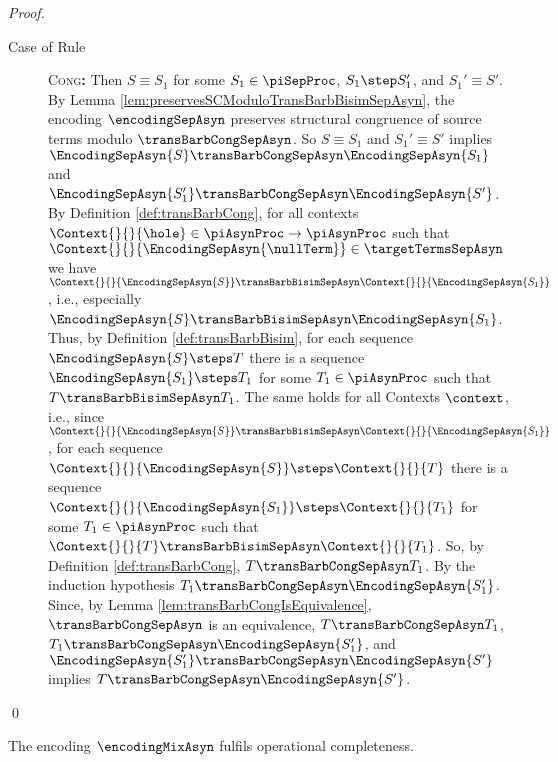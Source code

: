 \documentclass[]{llncs}
\begin{document}
\begin{proof}
\begin{description}
\begin{description}
				\item[Case of Rule] \textsc{Cong}\textbf{:} Then $ S \equiv S_1 $ for some $ S_1 \in \piSepProc $, $ S_1 \step S_1' $, and $ S_1' \equiv S' $. By Lemma \ref{lem:preservesSCModuloTransBarbBisimSepAsyn}, the encoding $ \encodingSepAsyn $ preserves structural congruence of source terms modulo $ \transBarbCongSepAsyn $. So $ S \equiv S_1 $ and $ S_1' \equiv S' $ implies $ \EncodingSepAsyn{S} \transBarbCongSepAsyn \EncodingSepAsyn{S_1} $ and $ \EncodingSepAsyn{S_1'} \transBarbCongSepAsyn \EncodingSepAsyn{S'} $. By Definition \ref{def:transBarbCong}, for all contexts $ \Context{}{}{\hole} \in \piAsynProc \to \piAsynProc $ such that $ \Context{}{}{\EncodingSepAsyn{\nullTerm}} \in \targetTermsSepAsyn $ we have $ \Context{}{}{\EncodingSepAsyn{S}} \transBarbBisimSepAsyn \Context{}{}{\EncodingSepAsyn{S_1}} $, i.e., especially $ \EncodingSepAsyn{S} \transBarbBisimSepAsyn \EncodingSepAsyn{S_1} $. Thus, by Definition \ref{def:transBarbBisim}, for each sequence $ \EncodingSepAsyn{S} \steps T $ there is a sequence $ \EncodingSepAsyn{S_1} \steps T_1 $ for some $ T_1 \in \piAsynProc $ such that $ T \transBarbBisimSepAsyn T_1 $. The same holds for all Contexts $ \context $, i.e., since $ \Context{}{}{\EncodingSepAsyn{S}} \transBarbBisimSepAsyn \Context{}{}{\EncodingSepAsyn{S_1}} $, for each sequence $ \Context{}{}{\EncodingSepAsyn{S}} \steps \Context{}{}{T} $ there is a sequence $ \Context{}{}{\EncodingSepAsyn{S_1}} \steps \Context{}{}{T_1} $ for some $ T_1 \in \piAsynProc $ such that $ \Context{}{}{T} \transBarbBisimSepAsyn \Context{}{}{T_1} $. So, by Definition \ref{def:transBarbCong}, $ T \transBarbCongSepAsyn T_1 $. By the induction hypothesis $ T_1 \transBarbCongSepAsyn \EncodingSepAsyn{S_1'} $. Since, by Lemma \ref{lem:transBarbCongIsEquivalence}, $ \transBarbCongSepAsyn $ is an equivalence, $ T \transBarbCongSepAsyn T_1 $, $ T_1 \transBarbCongSepAsyn \EncodingSepAsyn{S_1'} $, and $ \EncodingSepAsyn{S_1'} \transBarbCongSepAsyn \EncodingSepAsyn{S'} $ implies $ T \transBarbCongSepAsyn \EncodingSepAsyn{S'} $.
			\end{description}
	\end{description}
	\qed
\end{proof}

\begin{lemma} \label{lem:operationalCompletenessMixAsyn}
	The encoding $ \encodingMixAsyn $ fulfils operational completeness.
\end{lemma}
\end{document}
